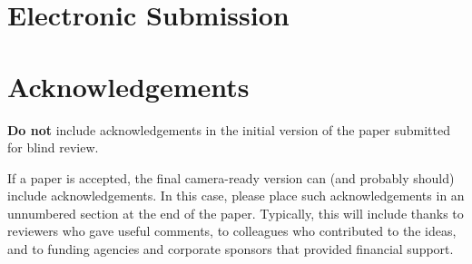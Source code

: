 \documentclass{article}
\begin{document}
 


\begin{abstract} 
The purpose of this document is to provide both the basic paper template and
submission guidelines. Abstracts should be a single paragraph, between 4--6 sentences long, ideally.  Gross violations will trigger corrections at the camera-ready phase.
\end{abstract} 

\section{Electronic Submission}
\label{submission}

\section*{Acknowledgements} 
 
\textbf{Do not} include acknowledgements in the initial version of
the paper submitted for blind review.

If a paper is accepted, the final camera-ready version can (and
probably should) include acknowledgements. In this case, please
place such acknowledgements in an unnumbered section at the
end of the paper. Typically, this will include thanks to reviewers
who gave useful comments, to colleagues who contributed to the ideas, 
and to funding agencies and corporate sponsors that provided financial 
support.  





\end{document}
